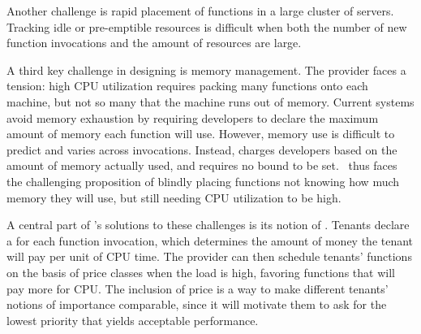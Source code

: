 Another challenge is rapid placement of functions in a large cluster of servers.
Tracking idle or pre-emptible resources is difficult when both the number of new
function invocations and the amount of resources are large.

A third key challenge in designing \sys{} is memory management. The provider
faces a tension: high CPU utilization requires packing many functions onto each
machine, but not so many that the machine runs out of memory. Current systems
avoid memory exhaustion by requiring developers to declare the maximum amount of
memory each function will use. However, memory use is difficult to predict and
varies across invocations. Instead, \sys{} charges developers based on the
amount of memory actually used, and requires no bound to be set.~\Sys{} thus
faces the challenging proposition of blindly placing functions not knowing how
much memory they will use, but still needing CPU utilization to be high.

A central part of {\sys}'s solutions to these challenges is its notion
of \emph{\priceclass{}}. Tenants declare a {\priceclass} for each
function invocation, which determines the amount of money the tenant
will pay per unit of CPU time. The provider can then schedule tenants'
functions on the basis of price classes when the load is high,
favoring functions that will pay more for CPU. The inclusion of price
is a way to make different tenants' notions of importance comparable,
since it will motivate them to ask for the lowest priority that yields
acceptable performance.
